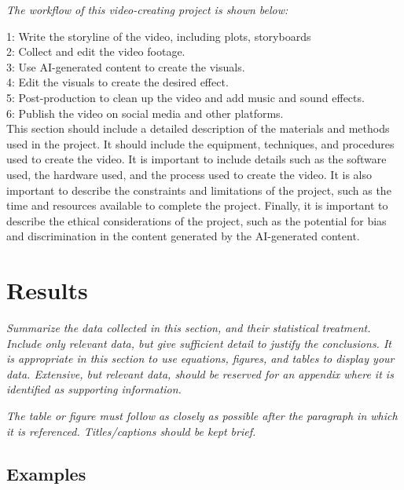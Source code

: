 \documentclass[11pt,a4paper,oneside]{report}
\newcommand{\instructions}[1]{{\color{black}\itshape #1}}
\begin{document}
\instructions{The workflow of this video-creating project is shown below:

1: Write the storyline of the video, including plots, storyboards \\
2: Collect and edit the video footage.\\
3: Use AI-generated content to create the visuals. \\
4: Edit the visuals to create the desired effect. \\
5: Post-production to clean up the video and add music and sound effects. \\
6: Publish the video on social media and other platforms. \\

This section should include a detailed description of the materials and
methods used in the project. It should include the equipment, techniques,
and procedures used to create the video. It is important to include
details such as the software used, the hardware used, and the process
used to create the video. It is also important to describe the
constraints and limitations of the project, such as the time and
resources available to complete the project. Finally, it is important
to describe the ethical considerations of the project, such as the
potential for bias and discrimination in the content generated by the
AI-generated content.
}


\chapter{Results}
\label{results}

\instructions{Summarize the data collected in this section, and their
statistical treatment. Include only relevant data, but give sufficient
detail to justify the conclusions. It is appropriate in this section to
use equations, figures, and tables to display your data. Extensive, but
relevant data, should be reserved for an appendix where it is identified
as supporting information.}

\instructions{The table or figure must follow as closely as possible after the
paragraph in which it is referenced. Titles/captions should be kept
brief.}

\section{Examples}
\end{document}
